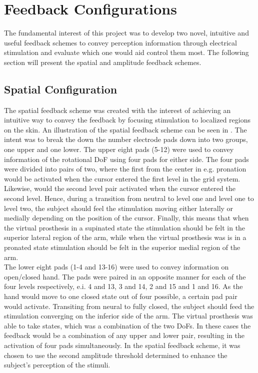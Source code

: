 \section{Feedback Configurations} \label{sec:feed}

The fundamental interest of this project was to develop two novel, intuitive and useful feedback schemes to convey perception information through electrical stimulation and evaluate which one would aid control them most. The following section will present the spatial and amplitude feedback schemes.     

\subsection{Spatial Configuration}

The spatial feedback scheme was created with the interest of achieving an intuitive way to convey the feedback by focusing stimulation to localized regions on the skin. An illustration of the spatial feedback scheme can be seen in . The intent was to break the down the number electrode pads down into two groups, one upper and one lower. The upper eight pads (5-12) were used to convey information of the rotational DoF using four pads for either side.  The four pads were divided into pairs of two, where the first from the center in e.g. pronation would be activated when the cursor entered the first level in the grid system. Likewise, would the second level pair activated when the cursor entered the second level. Hence, during a transition from neutral to level one and level one to level two, the subject should feel the stimulation moving either laterally or medially depending on the position of the cursor. Finally, this means that when the virtual prosthesis in a supinated state the stimulation should be felt in the superior lateral region of the arm, while when the virtual prosthesis was is in a pronated state stimulation should be felt in the superior medial region of the arm.   \\
The lower eight pads (1-4 and 13-16) were used to convey information on open/closed hand. The pads were paired in an opposite manner for each of the four levels respectively, e.i. 4 and 13, 3 and 14, 2 and 15 and 1 and 16. As the hand would move to one closed state out of four possible, a certain pad pair would activate. Transiting from neural to fully closed, the subject should feed the stimulation converging on the inferior side of the arm. The virtual prosthesis was able to take states, which was a combination of the two DoFs. In these cases the feedback would be a combination of any upper and lower pair, resulting in the activation of four pads simultaneously. In the spatial feedback scheme, it was chosen to use the second amplitude threshold determined to enhance the subject's perception of the stimuli. 

